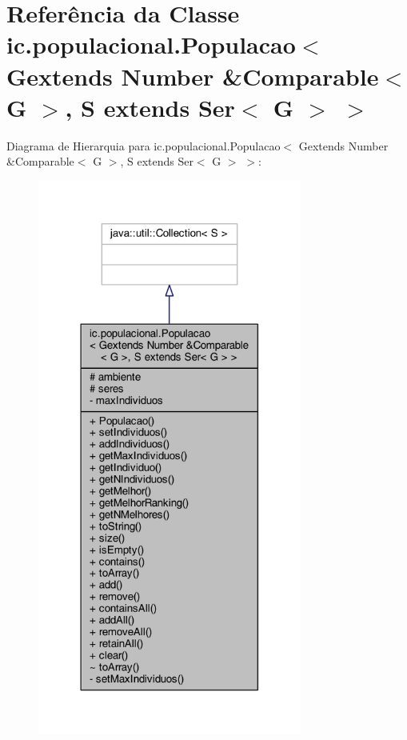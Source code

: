 \hypertarget{classic_1_1populacional_1_1_populacao_3_01_gextends_01_number_01_6_comparable_3_01_g_01_4_00_01_439c3806f66bccf03e2d51ecb538a0c8}{\section{Referência da Classe ic.\-populacional.\-Populacao$<$ Gextends Number \&Comparable$<$ G $>$, S extends Ser$<$ G $>$ $>$}
\label{classic_1_1populacional_1_1_populacao_3_01_gextends_01_number_01_6_comparable_3_01_g_01_4_00_01_439c3806f66bccf03e2d51ecb538a0c8}
}


Diagrama de Hierarquia para ic.\-populacional.\-Populacao$<$ Gextends Number \&Comparable$<$ G $>$, S extends Ser$<$ G $>$ $>$\-:
\nopagebreak
\begin{figure}[H]
\begin{center}
\leavevmode
\includegraphics[width=246pt]{classic_1_1populacional_1_1_populacao_3_01_gextends_01_number_01_6_comparable_3_01_g_01_4_00_01_751f096085653fbf08f0dbad1ebe8bd6}
\end{center}
\end{figure}


